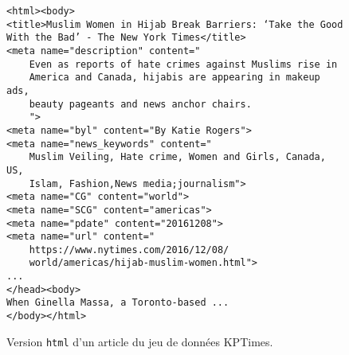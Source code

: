 \begin{figure}[!htbp]
\begin{verbatim}
<html><body>
<title>Muslim Women in Hijab Break Barriers: ‘Take the Good
With the Bad’ - The New York Times</title>
<meta name="description" content="
    Even as reports of hate crimes against Muslims rise in
    America and Canada, hijabis are appearing in makeup ads, 
    beauty pageants and news anchor chairs.
    ">
<meta name="byl" content="By Katie Rogers">
<meta name="news_keywords" content="
    Muslim Veiling, Hate crime, Women and Girls, Canada, US,
    Islam, Fashion,News media;journalism">
<meta name="CG" content="world">
<meta name="SCG" content="americas">
<meta name="pdate" content="20161208">
<meta name="url" content="
    https://www.nytimes.com/2016/12/08/
    world/americas/hijab-muslim-women.html">
...
</head><body>
When Ginella Massa, a Toronto-based ...
</body></html>
\end{verbatim}
    \caption{Version \texttt{html} d'un article du jeu de données KPTimes.}
\end{figure}